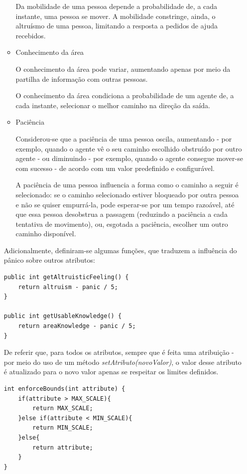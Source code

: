 \documentclass[12pt]{article}
\begin{document}
\begin{titlepage}
\begin{itemize}
\begin{itemize}
Da mobilidade de uma pessoa depende a probabilidade de, a cada instante, uma pessoa se mover. A mobilidade constringe, ainda, o altruísmo de uma pessoa, limitando a resposta a pedidos de ajuda recebidos.\newline

\item Conhecimento da área

O conhecimento da área pode variar, aumentando apenas por meio da partilha de informação com outras pessoas.

O conhecimento da área condiciona a probabilidade de um agente de, a cada instante, selecionar o melhor caminho na direção da saída.\newline

\item Paciência

Considerou-se que a paciência de uma pessoa oscila, aumentando - por exemplo, quando o agente vê o seu caminho escolhido obstruído por outro agente - ou diminuindo - por exemplo, quando o agente consegue mover-se com sucesso - de acordo com um valor predefinido e configurável.

A paciência de uma pessoa influencia a forma como o caminho a seguir é selecionado: se o caminho selecionado estiver bloqueado por outra pessoa e não se quiser empurrá-la, pode esperar-se por um tempo razoável, até que essa pessoa desobstrua a passagem (reduzindo a paciência a cada tentativa de movimento), ou, esgotada a paciência, escolher um outro caminho disponível.

\end{itemize}

Adicionalmente, definiram-se algumas funções, que traduzem a influência do pânico sobre outros atributos:

\begin{lstlisting}[caption= Código \textit{Java}\ de funções que traduzem a influência do pânico sobre o altruísmo e cohecimento de área.]
public int getAltruisticFeeling() {
	return altruism - panic / 5;
}

public int getUsableKnowledge() {
	return areaKnowledge - panic / 5;
}
\end{lstlisting}

De referir que, para todos os atributos, sempre que é feita uma atribuição - por meio do uso de um método \textit{setAtributo(novoValor)}, o valor desse atributo é atualizado para o novo valor apenas se respeitar os limites definidos.
\newline
\begin{lstlisting}[caption= Código \textit{Java}\ da função que assegura que os vários atributos respeitam os limites definidos.]
int enforceBounds(int attribute) {
	if(attribute > MAX_SCALE){
		return MAX_SCALE;
	}else if(attribute < MIN_SCALE){
		return MIN_SCALE;
	}else{
		return attribute;
	}
}
\end{lstlisting}
\newpage


\end{itemize}
\end{titlepage}
\end{document}
